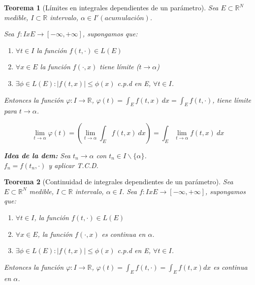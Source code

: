 \documentclass{article}
\newtheorem{theorem}{Teorema}
\begin{document}
\begin{theorem}[Límites en integrales dependientes de un parámetro]
Sea $E \subset \mathbb{R}^N$ medible, $I \subset \mathbb{R}$ intervalo, $\alpha \in I' (acumulación)$. 

Sea $f:IxE \rightarrow [-\infty, + \infty]$, supongamos que:

\begin{enumerate}[label=(\roman*)]
\item $\forall t \in I$ la función $f(t,\cdot) \in L(E)$

\item $\forall x \in E$ la función $f(\cdot,x)$ tiene límite ($t \to \alpha$)

\item $\exists \phi \in L(E): |f(t,x)| \leq \phi(x)$ c.p.d en E, $\forall t \in I$.

\end{enumerate}

Entonces la función $\varphi: I \rightarrow \mathbb{R}$, $\varphi(t) = \int_E f(t,x)\>dx = \int_E f(t,\cdot)$, tiene límite para $t \to \alpha$.

\begin{equation*}
\lim_{t \to \alpha} \varphi(t) = (\lim_{t \to \alpha} \int_E f(t,x)\>dx)=\int_E \lim_{t \to \alpha} f(t,x)\>dx
\end{equation*}

\textbf{Idea de la dem:} Sea $t_n \to \alpha$ con $t_n \in I \backslash \{\alpha\}$. \\

$f_n = f(t_n,\cdot)$ y aplicar T.C.D.
\end{theorem}

\begin{theorem}[Continuidad de integrales dependientes de un parámetro]
Sea $E\subset \mathbb{R}^N$ medible, $I \subset \mathbb{R}$ intervalo, $\alpha \in I$.
Sea $f: IxE \rightarrow [-\infty, + \infty]$, supongamos que:

\begin{enumerate}[label=(\roman*)]
\item $\forall t \in I$, la función $f(t,\cdot) \in L(E)$
\item $\forall x \in E$, la función $f(\cdot, x)$ es continua en $\alpha$.
\item $\exists \phi \in L(E): |f(t,x)| \leq \phi(x)$ c.p.d en E, $\forall t \in I$. 
\end{enumerate}

Entonces la función $\varphi: I \rightarrow \mathbb{R}$, $\varphi(t) = \int_E f(t,\cdot) = \int_E f(t,x) dx$ es continua en $\alpha$.
\end{theorem}
\end{document}

